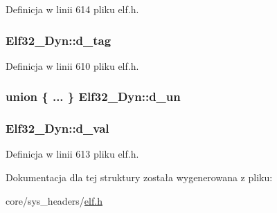 Definicja w linii 614 pliku elf.\-h.

\hypertarget{struct_elf32___dyn_a0edbe45a1c49cbb352dc3e1937369180}{
\subsubsection[{d\-\_\-tag}]{ Elf32\-\_\-\-Dyn\-::d\-\_\-tag}}\label{struct_elf32___dyn_a0edbe45a1c49cbb352dc3e1937369180}


Definicja w linii 610 pliku elf.\-h.

\hypertarget{struct_elf32___dyn_ae099cc9b66d91c8d96a079c748491c99}{
\subsubsection[{d\-\_\-un}]{\setlength{\rightskip}{0pt plus 5cm}union \{ ... \}   Elf32\-\_\-\-Dyn\-::d\-\_\-un}}\label{struct_elf32___dyn_ae099cc9b66d91c8d96a079c748491c99}
\hypertarget{struct_elf32___dyn_a00a89085454a384ae77fd9112b3062c7}{
\subsubsection[{d\-\_\-val}]{ Elf32\-\_\-\-Dyn\-::d\-\_\-val}}\label{struct_elf32___dyn_a00a89085454a384ae77fd9112b3062c7}


Definicja w linii 613 pliku elf.\-h.



Dokumentacja dla tej struktury została wygenerowana z pliku\-:\begin{DoxyCompactItemize}
\item 
core/sys\-\_\-headers/\hyperlink{elf_8h}{elf.\-h}\end{DoxyCompactItemize}
